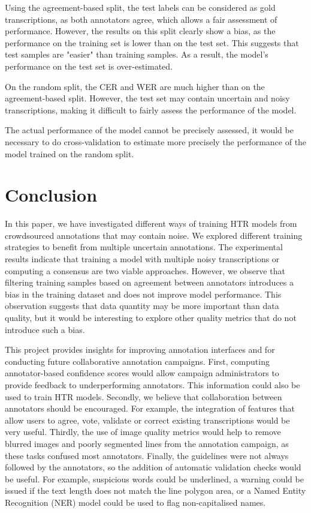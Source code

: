\documentclass[sigconf]{acmart}
\begin{document}
Using the agreement-based split, the test labels can be considered as gold transcriptions, as both annotators agree, which allows a fair assessment of performance. However, the results on this split clearly show a bias, as the performance on the training set is lower than on the test set. This suggests that test samples are "easier" than training samples. As a result, the model's performance on the test set is over-estimated.

On the random split, the CER and WER are much higher than on the agreement-based split. However, the test set may contain uncertain and noisy transcriptions, making it difficult to fairly assess the performance of the model. 

The actual performance of the model cannot be precisely assessed, it would be necessary to do cross-validation to estimate more precisely the performance of the model trained on the random split.


\section{Conclusion}
\label{sec:conclusion}
In this paper, we have investigated different ways of training HTR models from crowdsourced annotations that may contain noise. We explored different training strategies to benefit from multiple uncertain annotations. The experimental results indicate that training a model with multiple noisy transcriptions or computing a consensus are two viable approaches. However, we observe that filtering training samples based on agreement between annotators introduces a bias in the training dataset and does not improve model performance. This observation suggests that data quantity may be more important than data quality, but it would be interesting to explore other quality metrics that do not introduce such a bias.

This project provides insights for improving annotation interfaces and for conducting future collaborative annotation campaigns. 
First, computing annotator-based confidence scores would allow campaign administrators to provide feedback to underperforming annotators. This information could also be used to train HTR models. 
Secondly, we believe that collaboration between annotators should be encouraged. For example, the integration of features that allow users to agree, vote, validate or correct existing transcriptions would be very useful.
Thirdly, the use of image quality metrics would help to remove blurred images and poorly segmented lines from the annotation campaign, as these tasks confused most annotators. 
Finally, the guidelines were not always followed by the annotators, so the addition of automatic validation checks would be useful. For example, suspicious words could be underlined, a warning could be issued if the text length does not match the line polygon area, or a Named Entity Recognition (NER) model could be used to flag non-capitalised names.
\end{document}
